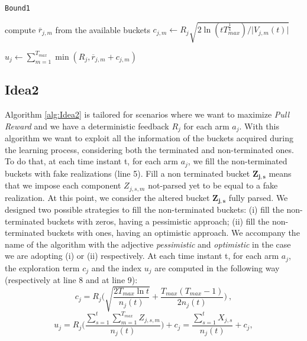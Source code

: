 \begin{algorithm}[H]
	\caption{\texttt{Bound1}}
	\begin{scriptsize}
		\begin{algorithmic}[1]
			
			
			
			
			
			\State compute $\overline{r}_{j,m}$ from the available buckets \;
			\State$c_{j,m}\gets R_j \sqrt{{2\ln(tT_{max}^{\frac{1}{4}})}/{\vert V_{j,m}(t) \vert}}$\;
			
			\EndFor		
			
			\State $u_j \gets \sum_{m=1}^{T_{max}} \min(R_j,\overline{r}_{j,m}+c_{j,m}) $\;	
			\EndFor
			
			
			
			
			\EndFunction
			
		\end{algorithmic}
	\end{scriptsize}
	\label{alg:Bound1}
\end{algorithm}

\subsection{Idea2}
Algorithm \ref{alg:Idea2} is tailored for scenarios where we want to maximize \emph{Pull Reward} and we have a deterministic feedback $R_j$ for each arm $a_j$. With this algorithm we want to exploit all the information of the buckets acquired during the learning process, considering both the terminated and non-terminated ones. To do that, at each time instant t, for each arm $a_j$, we fill the non-terminated buckets with fake realizations (line 5). Fill a non terminated bucket $\boldsymbol{Z_{j,s}}$ means that we impose each component $Z_{j,s,m}$ not-parsed yet to be equal to a fake realization. At this point, we consider the altered bucket $\boldsymbol{Z_{j,s}}$ fully parsed. We designed two possible strategies to fill the non-terminated buckets: (i)
fill the non-terminated buckets with zeros, having a pessimistic approach; (ii) fill the non-terminated buckets with ones, having an optimistic approach. We accompany the name of the algorithm with the adjective \emph{pessimistic} and \emph{optimistic} in the case we are adopting (i) or (ii) respectively. At each time instant t, for each arm $a_j$, the exploration term $c_j$ and the index $u_j$ are computed in the following way (respectively at line 8 and at line 9):
$$c_j = R_j \bigg( \sqrt{\frac{2T_{max}\ln{t}}{n_j(t)}} + \frac{T_{max}(T_{max}-1)}{2n_j(t)} \bigg) \ ,$$ 
$$
u_j = R_j \bigg( \frac{\sum_{s=1}^{t}\sum_{m=1}^{T_{max}}Z_{j,s,m}}{n_j(t)}\bigg)+c_j   = \frac{\sum_{s=1}^{t} X_{j,s}}{n_j(t)} +c_j  ,
$$

